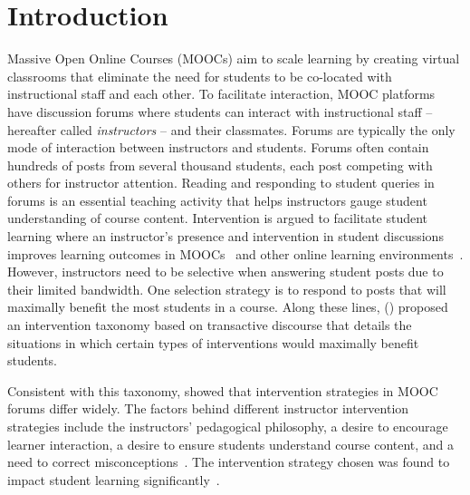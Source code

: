 \documentclass[letterpaper]{article}
\begin{document}
\section{Introduction}
\label{sect:intro}
Massive Open Online Courses (MOOCs) aim to scale learning by creating 
virtual classrooms that eliminate the need for students to be co-located 
with instructional staff and each other. To facilitate interaction, MOOC 
platforms have discussion forums where students can interact with instructional 
staff -- hereafter called {\it instructors} -- and their classmates. Forums are 
typically the only mode of interaction between instructors and 
students. Forums often contain hundreds of posts from several thousand 
students, each post competing with others for instructor attention.  
Reading and responding to student queries in forums is an essential teaching 
activity that helps instructors gauge student understanding of course 
content. Intervention is argued to facilitate student learning where an 
instructor's presence 
and intervention in student discussions improves learning 
outcomes in MOOCs~\cite{chen2016} and other online learning 
environments~\cite{garrison_critical_1999,phirangee_exploring_2016}. 
However, instructors need to be selective when answering student posts due to 
their limited bandwidth. One selection strategy is to respond 
to posts that will maximally benefit the most students in a course. 
Along these lines, \citeauthor{chandrasekaran2015towards} (\citeyear{chandrasekaran2015towards}) 
proposed an intervention taxonomy based on transactive discourse that details 
the situations in which certain types of interventions would maximally benefit 
students. 

Consistent with this taxonomy, \citeauthor{chandrasekaran2015learning} 
showed that intervention strategies in MOOC forums differ widely.
The factors behind different instructor intervention strategies include the 
instructors' pedagogical philosophy, a desire to encourage learner 
interaction, a desire to ensure students understand course content, and a 
need to correct misconceptions~\cite{phirangee_fill_2016}. 
The intervention strategy chosen was found to impact student learning 
significantly~\cite{mazzolini2003,mazzolini2007}.
\end{document}
